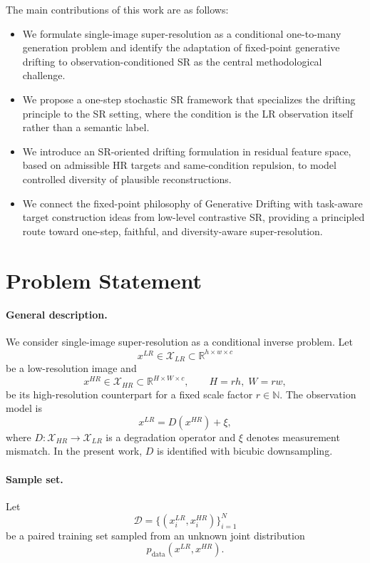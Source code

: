 \documentclass{article}
\begin{document}
The main contributions of this work are as follows:
\begin{itemize}
    \item We formulate single-image super-resolution as a conditional one-to-many generation problem and identify the adaptation of fixed-point generative drifting to observation-conditioned SR as the central methodological challenge.
    \item We propose a one-step stochastic SR framework that specializes the drifting principle to the SR setting, where the condition is the LR observation itself rather than a semantic label.
    \item We introduce an SR-oriented drifting formulation in residual feature space, based on admissible HR targets and same-condition repulsion, to model controlled diversity of plausible reconstructions.
    \item We connect the fixed-point philosophy of Generative Drifting with task-aware target construction ideas from low-level contrastive SR, providing a principled route toward one-step, faithful, and diversity-aware super-resolution.
\end{itemize}


\section{Problem Statement}\label{sec:problem}

\paragraph{General description.}
We consider single-image super-resolution as a conditional inverse problem. Let
\[
x^{LR} \in \mathcal{X}_{LR} \subset \mathbb{R}^{h\times w\times c}
\]
be a low-resolution image and
\[
x^{HR} \in \mathcal{X}_{HR} \subset \mathbb{R}^{H\times W\times c},
\qquad H=rh,\; W=rw,
\]
be its high-resolution counterpart for a fixed scale factor \(r\in\mathbb{N}\). The observation model is
\[
x^{LR} = D(x^{HR}) + \xi,
\]
where \(D:\mathcal{X}_{HR}\to\mathcal{X}_{LR}\) is a degradation operator and \(\xi\) denotes measurement mismatch. In the present work, \(D\) is identified with bicubic downsampling.

\paragraph{Sample set.}
Let
\[
\mathcal{D}=\{(x_i^{LR},x_i^{HR})\}_{i=1}^{N}
\]
be a paired training set sampled from an unknown joint distribution
\[
p_{\mathrm{data}}(x^{LR},x^{HR}).
\]
\end{document}
